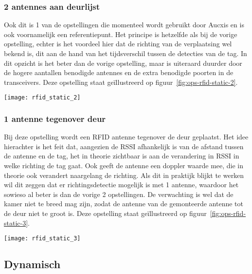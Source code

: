 \subsubsection{2 antennes aan deurlijst}
\begin{minipage}{0.65\textwidth}
Ook dit is 1 van de opstellingen die momenteel wordt gebruikt door Aucxis en is ook voornamelijk een referentiepunt. Het principe is hetzelfde als bij de vorige opstelling, echter is het voordeel hier dat de richting van de verplaatsing wel bekend is, dit aan de hand van het tijdsverschil tussen de detecties van de tag. In dit opzicht is het beter dan de vorige opstelling, maar is uiteraard duurder door de hogere aantallen benodigde antennes en de extra benodigde poorten in de transceivers. Deze opstelling staat geïllustreerd op figuur~\ref{fig:ops-rfid-static-2}.
\end{minipage}
\hfill
\begin{minipage}{0.30\textwidth}
	\texttt{[image: rfid\_static\_2]}
	\label{fig:ops-rfid-static-2}
\end{minipage}

\subsubsection{1 antenne tegenover deur}
\begin{minipage}{0.65\textwidth}
Bij deze opstelling wordt een RFID antenne tegenover de deur geplaatst. Het idee hierachter is het feit dat, aangezien de RSSI afhankelijk is van de afstand tussen de antenne en de tag, het in theorie zichtbaar is aan de verandering in RSSI in welke richting de tag gaat. Ook geeft de antenne een doppler waarde mee, die in theorie ook verandert naargelang de richting. Als dit in praktijk blijkt te werken wil dit zeggen dat er richtingsdetectie mogelijk is met 1 antenne, waardoor het sowieso al beter is dan de vorige 2 opstellingen. De verwachting is wel dat de kamer niet te breed mag zijn, zodat de antenne van de gemonteerde antenne tot de deur niet te groot is. Deze opstelling staat geïllustreerd op figuur~\ref{fig:ops-rfid-static-3}.
\end{minipage}
\hfill
\begin{minipage}{0.30\textwidth}
	\texttt{[image: rfid\_static\_3]}
	\label{fig:ops-rfid-static-3}
\end{minipage}
\subsection{Dynamisch}

